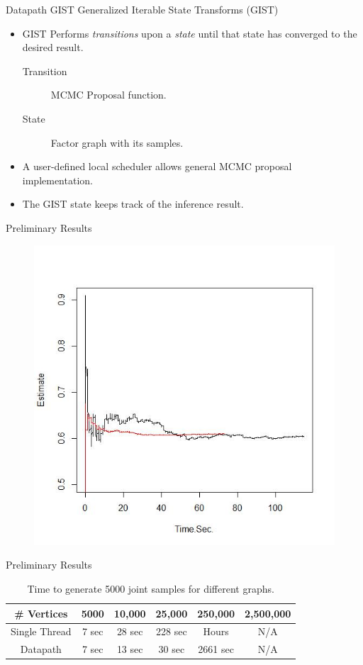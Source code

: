 \documentclass[onlymath,xcolor=pdftex,dvipsnames,table]{beamer}
\newcommand{\gist}{\textsc{GIST}\xspace}
\let\oldemph\emph
\renewcommand{\emph}[1]{{\color{Blue}\oldemph{#1}}}
\newcommand{\head}[1]{{\large\color{OliveGreen}#1\\[2pt]}}
\begin{document}
\begin{frame}{Datapath \gist}
\head{Generalized Iterable State Transforms (GIST)}
\begin{itemize}
  \item GIST Performs \emph{transitions} upon a \emph{state} until that state has converged to the desired result.
  \begin{description}
    \item[Transition] MCMC Proposal function.
    \item[State] Factor graph with its samples.
  \end{description}
  \item A user-defined local scheduler allows general MCMC proposal implementation.
  \item The GIST state keeps track of the inference result.
\end{itemize}
\end{frame}


\begin{frame}{Preliminary Results}
\begin{figure}
  \centering
  \includegraphics[width=.6\textwidth]{25k.jpg}
\end{figure}
\end{frame}


\begin{frame}{Preliminary Results}
\begin{table}[h]
  \centering
  \begin{tabular}{cccccc}\toprule
    \# Vertices & 5000	& 10,000 & 25,000 & 250,000 & 2,500,000\\\midrule
       Single Thread & 7 sec & 28 sec & 228 sec & Hours	& N/A\\
       Datapath & 7 sec & 13 sec & 30 sec & 2661 sec & N/A\\
     \bottomrule
  \end{tabular}
  \caption{Time to generate 5000 joint samples for different graphs.}
\end{table}
\end{frame}
\end{document}
